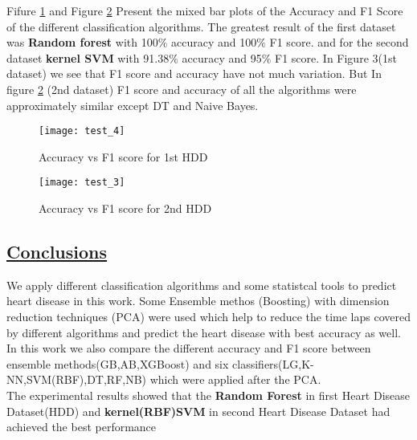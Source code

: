 \documentclass[11pt]{article}
\begin{document}
Fifure  \ref{fig:fig3} and Figure  \ref{fig:fig4}  Present the mixed bar plots of the Accuracy and F1 Score of the different classification algorithms. The greatest result of the first dataset was \textbf{Random forest} with 100$\%$ accuracy and  100$\%$ F1 score. and for the second dataset \textbf{kernel SVM}  with 91.38$\%$ accuracy and 95$\%$ F1 score.  In Figure 3(1st dataset) we see that F1 score and accuracy have not much variation. But In figure  \ref{fig:fig4} (2nd dataset) F1 score and accuracy of all the algorithms were approximately similar except  DT and Naive Bayes.
\begin{figure}[H]
\centering
\texttt{[image: test\_4]}
\caption{Accuracy vs F1 score for 1st HDD }
\label{fig:fig3}
\end{figure}
\vspace{-0.6cm}
\begin{figure}[H]
\centering
\texttt{[image: test\_3]}
\caption{Accuracy vs F1 score for 2nd HDD  }
\label{fig:fig4}
\end{figure}

\subsection{\underline{Conclusions}}
We apply different classification algorithms and some statistcal tools to predict heart disease in this work. Some Ensemble methos (Boosting) with dimension reduction techniques (PCA) were used which help to reduce the time laps covered by different algorithms and predict the heart disease with best accuracy as well. In this work we also compare the different accuracy and F1 score between ensemble methods(GB,AB,XGBoost) and six classifiers(LG,K-NN,SVM(RBF),DT,RF,NB) which were applied after the PCA.\\
The experimental results showed that the \textbf{Random Forest} in first Heart Disease Dataset(HDD) and \textbf{kernel(RBF)SVM} in second Heart Disease Dataset had achieved the best performance
\end{document}

